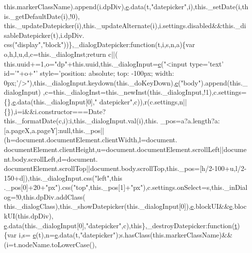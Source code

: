 \begin{DoxyCode}
      this.markerClassName).append(i.dpDiv),\hyperlink{jquery-ui_8min_8js_a2c038346d47955cbe2cb91e338edd7e1}{e}.data(t,\textcolor{stringliteral}{"datepicker"},i),this.\_setDate(i,this.\_getDefaultDate(i),!0),
      this.\_updateDatepicker(i),this.\_updateAlternate(i),i.settings.disabled&&this.\_disableDatepicker(t),i.dpDiv.
      css(\textcolor{stringliteral}{"display"},\textcolor{stringliteral}{"block"}))\},\_dialogDatepicker:\textcolor{keyword}{function}(t,i,s,n,a)\{var o,h,l,u,d,c=this.\_dialogInst;\textcolor{keywordflow}{return} c||(
      this.uuid+=1,o=\textcolor{stringliteral}{"dp"}+this.uuid,this.\_dialogInput=\hyperlink{jquery-ui_8min_8js_a2c038346d47955cbe2cb91e338edd7e1}{e}(\textcolor{stringliteral}{"<input type='text' id='"}+o+\textcolor{stringliteral}{"' style='position: absolute;
       top: -100px; width: 0px;'/>"}),this.\_dialogInput.keydown(this.\_doKeyDown),\hyperlink{jquery-ui_8min_8js_a2c038346d47955cbe2cb91e338edd7e1}{e}(\textcolor{stringliteral}{"body"}).append(this.\_dialogInput)
      ,c=this.\_dialogInst=this.\_newInst(this.\_dialogInput,!1),c.settings=\{\},\hyperlink{jquery-ui_8min_8js_a2c038346d47955cbe2cb91e338edd7e1}{e}.data(this.\_dialogInput[0],\textcolor{stringliteral}{"
      datepicker"},c)),r(c.settings,n||\{\}),i=i&&i.constructor===Date?\textcolor{keyword}{this}.\_formatDate(c,i):i,this.\_dialogInput.val(i),this.
      \_pos=a?a.length?a:[a.pageX,a.pageY]:null,this.\_pos||(h=document.documentElement.clientWidth,l=document.
      documentElement.clientHeight,u=document.documentElement.scrollLeft||document.body.scrollLeft,d=document.
      documentElement.scrollTop||document.body.scrollTop,this.\_pos=[h/2-100+u,l/2-150+d]),this.\_dialogInput.css(\textcolor{stringliteral}{"left"},\textcolor{keyword}{this}
      .\_pos[0]+20+\textcolor{stringliteral}{"px"}).css(\textcolor{stringliteral}{"top"},this.\_pos[1]+\textcolor{stringliteral}{"px"}),c.settings.onSelect=s,this.\_inDialog=!0,this.dpDiv.addClass(
      this.\_dialogClass),this.\_showDatepicker(this.\_dialogInput[0]),\hyperlink{jquery-ui_8min_8js_a2c038346d47955cbe2cb91e338edd7e1}{e}.blockUI&&\hyperlink{jquery-ui_8min_8js_a2c038346d47955cbe2cb91e338edd7e1}{e}.blockUI(this.dpDiv),
      \hyperlink{jquery-ui_8min_8js_a2c038346d47955cbe2cb91e338edd7e1}{e}.data(this.\_dialogInput[0],\textcolor{stringliteral}{"datepicker"},c),\textcolor{keyword}{this}\},\_destroyDatepicker:\textcolor{keyword}{function}(\hyperlink{jquery-2_80_83_8min_8js_aaccc9105df5383111407fd5b41255e23}{t})\{var i,s=
      \hyperlink{jquery-ui_8min_8js_a2c038346d47955cbe2cb91e338edd7e1}{e}(t),n=\hyperlink{jquery-ui_8min_8js_a2c038346d47955cbe2cb91e338edd7e1}{e}.data(t,\textcolor{stringliteral}{"datepicker"});s.hasClass(this.markerClassName)&&(i=t.nodeName.toLowerCase(),

\end{DoxyCode}
